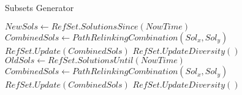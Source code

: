 \begin{algorithm}
  \caption{Subsets Generator}\label{alg:subsets}
  \begin{algorithmic}[0]
    \State $NewSols \gets RefSet.SolutionsSince(NowTime)$
    \State $CombinedSols \gets PathRelinkingCombination(Sol_x,Sol_y)$
    \State $RefSet.Update(CombinedSols)$
    \EndIf \EndFor
    \State $RefSet.UpdateDiversity()$
    \State $OldSols \gets RefSet.SolutionsUntil(NowTime)$
    \State $CombinedSols \gets PathRelinkingCombination(Sol_x,Sol_y)$
    \State $RefSet.Update(CombinedSols)$
    \EndIf \EndFor
    \State $RefSet.UpdateDiversity()$
    \EndFor \EndIf
    \EndProcedure
  \end{algorithmic}
\end{algorithm}
